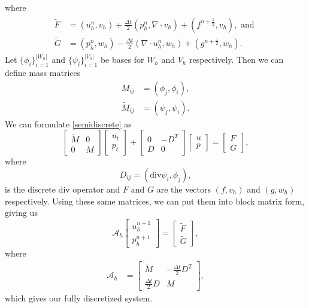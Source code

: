 \documentclass[11pt]{article}
\newcommand{\divv}{\mathrm{div}}
\begin{document}
where
\begin{eqnarray}
\begin{split}
\tilde{F} &= \left(u^n_h, v_h\right) +\frac{\Delta t}{2}\left(p^n_h,\nabla \cdot v_h\right)+\left(f^{n+\frac{1}{2}},v_h\right), \text{ and }\\
\tilde{G} &= \left(p^n_h,w_h\right) - \frac{\Delta t}{2}\left(\nabla \cdot u^n_h,w_h\right)+\left(g^{n+\frac{1}{2}},w_h\right).
\end{split}
\end{eqnarray}
 Let $\{\phi_i\}_{i=1}^{|W_h|}$ and $\{\psi_i\}_{i=1}^{|V_h|}$ be bases for $W_h$ and $V_h$ respectively. Then we can define mass matrices  %
\begin{equation}
\begin{split}
M_{ij} &= (\phi_j,\phi_i), \\
\tilde{M}_{ij} &= (\psi_j,\psi_i).
\end{split}
\end{equation}
We can formulate \eqref{semidiscrete} as
\begin{equation}
\begin{bmatrix}
\tilde{M} & 0\\
0 & M
\end{bmatrix} \begin{bmatrix}
u_t \\
p_t
\end{bmatrix} + \begin{bmatrix}
0 & -D^T \\
D & 0
\end{bmatrix} \begin{bmatrix}
u \\
p
\end{bmatrix} = \begin{bmatrix}
F \\
G
\end{bmatrix},
\end{equation} %
where
\begin{equation}
D_{ij} = (\divv \psi_i, \phi_j),
\end{equation}
 is the discrete div operator and $F$ and $G$ are the vectors $(f,v_h)$ and $(g,w_h)$ respectively. Using these same matrices, we can put them into block matrix form, giving us
\begin{equation}\label{FEcoeffoperator}
\mathscr{A}_h
\begin{bmatrix}
u^{n+1}_h \\
p^{n+1}_h
\end{bmatrix}
=
\begin{bmatrix}
\tilde{F}\\
\tilde{G}
\end{bmatrix},
\end{equation}
where
\begin{equation}\label{discretcoefop}
\begin{split}
\mathscr{A}_h &= \begin{bmatrix}
\tilde{M} & -\frac{\Delta t}{2}D^T \\
\frac{\Delta t}{2}D & M
\end{bmatrix},
\end{split}
\end{equation} which gives our fully discretized system.
\end{document}
